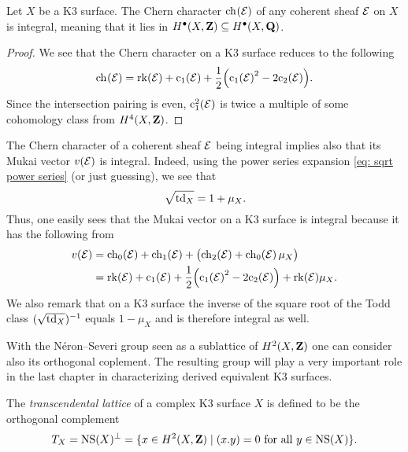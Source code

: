 \begin{corollary}
    Let $X$ be a K3 surface. The Chern character $\ch[](\E)$ of any coherent sheaf $\mathcal E$ on $X$ is integral, meaning that it lies in $H^{\bullet}(X, \mathbf Z) \subseteq H^{\bullet}(X, \mathbf Q)$.
\end{corollary}

\begin{proof}
    We see that the Chern character on a K3 surface reduces to the following
    \[
        \ch[]{\E} = \rk{\E} + \cclass[1]{\E} + \frac{1}{2}\Bigl(\cclass[1]{\E}^2 - 2\cclass[2]{\E}\Bigr).
    \]
    Since the intersection pairing is even, $\cclass[1]^2(\E)$ is twice a multiple of some cohomology class from $H^{4}(X, \mathbf Z)$.
\end{proof}

\begin{remark}
The Chern character of a coherent sheaf $\mathcal E$ being integral implies also that its Mukai vector $v(\mathcal E)$ is integral. Indeed, using the power series expansion \eqref{eq: sqrt power series} (or just guessing), we see that 
\[
    \sqrt{\operatorname{td}_{X}} = 1 + \mu_X.
\]
Thus, one easily sees that the Mukai vector on a K3 surface is integral because it has the following from
\begin{align}
    v(\E) &= \ch[0](\E) + \ch[1]{\E} + \bigl(\ch[2]{\E} + \ch[0]{\E}\mu_X\bigr)
    \label{eq: Mukai vector on K3 chern character} \\
    &= \rk{\E} + \cclass[1]{\E} + \frac{1}{2}\Bigl(\cclass[1]{\E}^2 - 2\cclass[2]{\E}\Bigr) + \rk{\E}\mu_X. \notag
\end{align}
We also remark that on a K3 surface the inverse of the square root of the Todd class $(\sqrt{\operatorname{td}_{X}})^{-1}$ equals $1 - \mu_X$ and is therefore integral as well.
\end{remark}

With the Néron--Severi group seen as a sublattice of $H^{2}(X, \mathbf Z)$ one can consider also its orthogonal coplement. The resulting group will play a very important role in the last chapter in characterizing derived equivalent K3 surfaces. 

\begin{definition}
    The \emph{transcendental lattice} of a complex K3 surface $X$ is defined to be the orthogonal complement
    \[
        T_{X} = \operatorname{NS}(X)^\perp = \{ x \in H^{2}(X, \mathbf Z) \mid (x.y) = 0 \text{ for all $y \in \operatorname{NS}(X)$}\}.
    \]
\end{definition}

